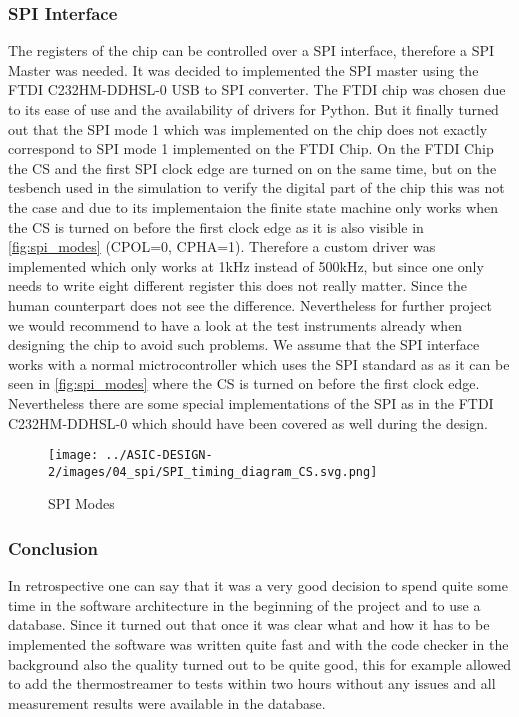 \subsubsection{SPI Interface}
\label{subsubsec:SPI}
The registers of the chip can be controlled over a SPI interface, therefore a SPI Master was needed.
It was decided to implemented the SPI master using the FTDI C232HM-DDHSL-0 USB to SPI converter. The FTDI chip was chosen due to its ease of use and the availability of drivers for Python. But it finally turned out that the SPI mode 1 which was implemented on the chip does not exactly correspond to SPI mode 1 implemented on the FTDI Chip. On the FTDI Chip the CS and the first SPI clock edge are turned on on the same time, but on the tesbench used in the simulation to verify the digital part of the chip this was not the case and due to its implementaion the finite state machine only works when the CS is turned on before the first clock edge as it is also visible in \autoref{fig:spi_modes} (CPOL=0, CPHA=1). Therefore a custom driver was implemented which only works at 1kHz instead of 500kHz, but since one only needs to write eight different register this does not really matter. Since the human counterpart does not see the difference. Nevertheless for further project we would recommend to have a look at the test instruments already when designing the chip to avoid such problems. We assume that the SPI interface works with a normal mictrocontroller which uses the SPI standard as as it can be seen in \autoref{fig:spi_modes} where the CS is turned on before the first clock edge. Nevertheless there are some special implementations of the SPI as in the FTDI C232HM-DDHSL-0 which should have been covered as well during the design.
\begin{figure}[h]
    \centering
    \texttt{[image: ../ASIC-DESIGN-2/images/04\_spi/SPI\_timing\_diagram\_CS.svg.png]}
    \caption{SPI Modes \cite{Wikipedia:SPI}}
    \label{fig:spi_modes}
\end{figure}
\subsubsection{Conclusion}
In retrospective one can say that it was a very good decision to spend quite some time in the software architecture in the beginning of the project and to use a database. Since it turned out that once it was clear what and how it has to be implemented the software was written quite fast and with the code checker in the background also the quality turned out to be quite good, this for example allowed to add the thermostreamer to tests within two hours without any issues and all measurement results were available in the database.



